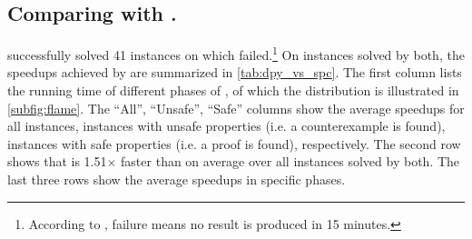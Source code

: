 
\subsection{Comparing \dpy with \spc.} 
\dpy successfully solved 41 instances on which \spc failed.\footnote{According to
  \chccomp, failure means no result is produced in 15 minutes.} 
On instances solved by both, the speedups achieved by \dpy are summarized in 
\cref{tab:dpy_vs_spc}. The first column lists the running time of different phases of \dpy, of which the distribution is illustrated in \cref{subfig:flame}. The ``All'', ``Unsafe'', ``Safe'' columns show the average speedups for all instances, instances with unsafe properties (i.e. a counterexample is found), instances with safe properties (i.e. a proof is found), respectively. 
The second row shows that \dpy is 1.51$\times$ faster than \spc on average over all instances solved by both.
The last three rows show the average speedups in specific phases.



